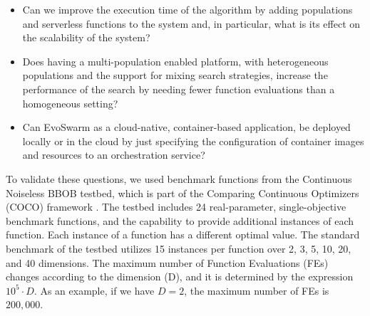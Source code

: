 \documentclass[review]{elsarticle}
\begin{document}

\begin{itemize}
\item Can we improve the execution time of the algorithm by adding populations
 and serverless functions to the system and, in particular, what is its effect on the scalability of the system? %
 
\item Does having a multi-population enabled platform, with heterogeneous populations and
the support for mixing search strategies,  increase the performance of the
search by needing fewer function evaluations than a homogeneous setting? %
\item Can EvoSwarm as a cloud-native, container-based application,  be deployed
locally or in the cloud by just specifying the configuration of container images
and resources to an orchestration service? %
\end{itemize}


To validate these questions, we used benchmark functions from the Continuous
Noiseless BBOB testbed, which is part of the Comparing Continuous Optimizers
(COCO) framework \cite{hansen2016coco}. The testbed includes 24 real-parameter,
single-objective benchmark functions, and the capability to provide additional
instances of each function. Each instance of a function has a different optimal
value. The standard benchmark of the testbed utilizes 15 instances per function
over 2, 3, 5, 10, 20, and 40 dimensions. The maximum number of Function
Evaluations (FEs) changes according to the dimension (D), and it is determined
by the expression $10^5 \cdot D$. As an example, if we have $D = 2$, the
maximum number of FEs is $200,000$.
\end{document}
